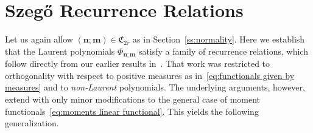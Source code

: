 \documentclass[reqno,centertags,11pt,draft]{amsart}
\newtheorem{rem}[thm]{Remark}
\newcommand{\T}{\mathbb{\partial\mathbb{D}}}
\begin{document}
    
  




\section{Szeg\H{o} Recurrence Relations}\label{ss:SzegoNEW}
Let us again allow $(\bm{n};\bm{m})\in\mathfrak{C}_{2r}$ as in Section~\ref{ss:normality}.
Here we establish that the Laurent polynomials $\Phi_{\bm{n};\bm{m}}$ satisfy a family of recurrence relations, which follow directly from our earlier results in~\cite{KVMOPUC}. That work was restricted to orthogonality with respect to positive measures as in~\eqref{eq:functionals given by measures} and to {\it non-Laurent} polynomials. The underlying arguments, however, extend with only minor modifications to the general case of moment functionals~\eqref{eq:moments linear functional}. This yields the following generalization.
\end{document}
